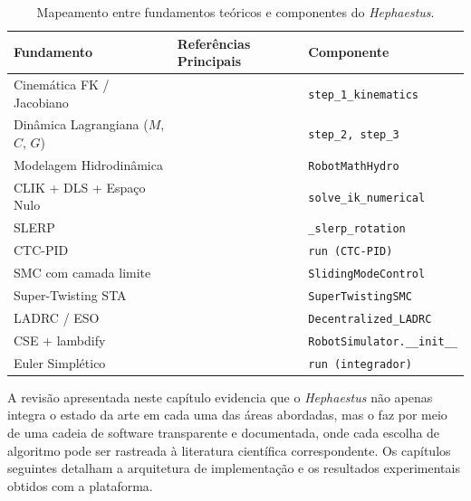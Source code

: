 \begin{table}[h!]
\centering
\caption{Mapeamento entre fundamentos teóricos e componentes do \textit{Hephaestus}.}
\label{tab:revisao_sintetica}
\begin{tabular}{p{4.5cm} p{5.0cm} p{4.0cm}}
\hline
\textbf{Fundamento} & \textbf{Referências Principais} & \textbf{Componente} \\
\hline
Cinemática FK / Jacobiano & \cite{craig1989introduction, spong2020robot, siciliano2009robotics} & \texttt{step\_1\_kinematics} \\
Dinâmica Lagrangiana ($M$, $C$, $G$) & \cite{hollerbach1980recursive, spong2020robot} & \texttt{step\_2, step\_3} \\
Modelagem Hidrodinâmica & \cite{fossen2011handbook, antonelli2014modelling} & \texttt{RobotMathHydro} \\
CLIK + DLS + Espaço Nulo & \cite{chiaverini1994review, nakamura1986inverse, chiaverini1997singularity} & \texttt{solve\_ik\_numerical} \\
SLERP & \cite{shoemake1985animating, dam1998quaternions} & \texttt{\_slerp\_rotation} \\
CTC-PID & \cite{craig1989introduction, astrom1995theory} & \texttt{run (CTC-PID)} \\
SMC com camada limite & \cite{slotine1991applied, edwards1998sliding} & \texttt{SlidingModeControl} \\
Super-Twisting STA & \cite{levant1993sliding, moreno2012strict} & \texttt{SuperTwistingSMC} \\
LADRC / ESO & \cite{han2009pid, gao2003scaling, zheng2010practical} & \texttt{Decentralized\_LADRC} \\
CSE + lambdify & \cite{meurer2017sympy, alfred2007compilers} & \texttt{RobotSimulator.\_\_init\_\_} \\
Euler Simplético & \cite{leimkuhler2004simulating, hairer2006geometric} & \texttt{run (integrador)} \\
\hline
\end{tabular}
\end{table}

A revisão apresentada neste capítulo evidencia que o \textit{Hephaestus} não apenas integra o estado da arte em cada uma das áreas abordadas, mas o faz por meio de uma cadeia de software transparente e documentada, onde cada escolha de algoritmo pode ser rastreada à literatura científica correspondente. Os capítulos seguintes detalham a arquitetura de implementação e os resultados experimentais obtidos com a plataforma.
